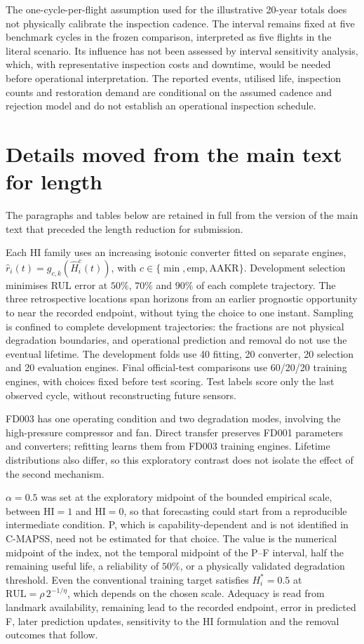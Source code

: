 \documentclass[12pt]{article}
\newcommand{\RUL}{\mathrm{RUL}}
\begin{document}
The one-cycle-per-flight assumption used for the illustrative 20-year totals does not physically calibrate the inspection cadence. The interval remains fixed at five benchmark cycles in the frozen comparison, interpreted as five flights in the literal scenario. Its influence has not been assessed by interval sensitivity analysis, which, with representative inspection costs and downtime, would be needed before operational interpretation. The reported events, utilised life, inspection counts and restoration demand are conditional on the assumed cadence and rejection model and do not establish an operational inspection schedule.

\section{Details moved from the main text for length}
The paragraphs and tables below are retained in full from the version of the main text that preceded the length reduction for submission.

Each HI family uses an increasing isotonic converter \cite{Barlow1972} fitted on separate engines, $\widehat r_i(t)=g_{c,k}(\widehat H_i^c(t))$, with $c\in\{\min,\mathrm{emp},\mathrm{AAKR}\}$. Development selection minimises RUL error at $50\%$, $70\%$ and $90\%$ of each complete trajectory. The three retrospective locations span horizons from an earlier prognostic opportunity to near the recorded endpoint, without tying the choice to one instant. Sampling is confined to complete development trajectories: the fractions are not physical degradation boundaries, and operational prediction and removal do not use the eventual lifetime. The development folds use 40 fitting, 20 converter, 20 selection and 20 evaluation engines. Final official-test comparisons use 60/20/20 training engines, with choices fixed before test scoring. Test labels score only the last observed cycle, without reconstructing future sensors.

FD003 has one operating condition and two degradation modes, involving the high-pressure compressor and fan. Direct transfer preserves FD001 parameters and converters; refitting learns them from FD003 training engines. Lifetime distributions also differ, so this exploratory contrast does not isolate the effect of the second mechanism.

$\alpha=0.5$ was set at the exploratory midpoint of the bounded empirical scale, between $\mathrm{HI}=1$ and $\mathrm{HI}=0$, so that forecasting could start from a reproducible intermediate condition. P, which is capability-dependent and is not identified in C-MAPSS, need not be estimated for that choice. The value is the numerical midpoint of the index, not the temporal midpoint of the P--F interval, half the remaining useful life, a reliability of $50\%$, or a physically validated degradation threshold. Even the conventional training target satisfies $H_i^*=0.5$ at $\RUL=\rho\,2^{-1/\eta}$, which depends on the chosen scale. Adequacy is read from landmark availability, remaining lead to the recorded endpoint, error in predicted F, later prediction updates, sensitivity to the HI formulation and the removal outcomes that follow.
\end{document}
